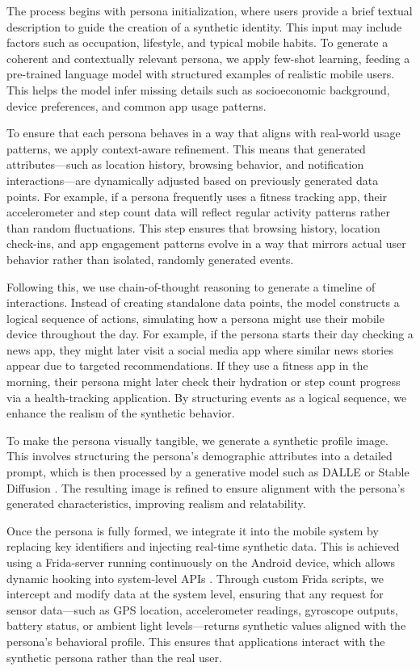 \documentclass[acmlarge, nonacm]{acmart}
\begin{document}
The process begins with persona initialization, where users provide a brief textual description to guide the creation of a synthetic identity. This input may include factors such as occupation, lifestyle, and typical mobile habits. To generate a coherent and contextually relevant persona, we apply few-shot learning, feeding a pre-trained language model with structured examples of realistic mobile users. This helps the model infer missing details such as socioeconomic background, device preferences, and common app usage patterns.

To ensure that each persona behaves in a way that aligns with real-world usage patterns, we apply context-aware refinement. This means that generated attributes—such as location history, browsing behavior, and notification interactions—are dynamically adjusted based on previously generated data points. For example, if a persona frequently uses a fitness tracking app, their accelerometer and step count data will reflect regular activity patterns rather than random fluctuations. This step ensures that browsing history, location check-ins, and app engagement patterns evolve in a way that mirrors actual user behavior rather than isolated, randomly generated events.

Following this, we use chain-of-thought reasoning to generate a timeline of interactions. Instead of creating standalone data points, the model constructs a logical sequence of actions, simulating how a persona might use their mobile device throughout the day. For example, if the persona starts their day checking a news app, they might later visit a social media app where similar news stories appear due to targeted recommendations. If they use a fitness app in the morning, their persona might later check their hydration or step count progress via a health-tracking application. By structuring events as a logical sequence, we enhance the realism of the synthetic behavior.

To make the persona visually tangible, we generate a synthetic profile image. This involves structuring the persona’s demographic attributes into a detailed prompt, which is then processed by a generative model such as DALLE \cite{dalle} or Stable Diffusion \cite{stablediffusion}. The resulting image is refined to ensure alignment with the persona’s generated characteristics, improving realism and relatability.

Once the persona is fully formed, we integrate it into the mobile system by replacing key identifiers and injecting real-time synthetic data. This is achieved using a Frida-server running continuously on the Android device, which allows dynamic hooking into system-level APIs \cite{frida}. Through custom Frida scripts, we intercept and modify data at the system level, ensuring that any request for sensor data—such as GPS location, accelerometer readings, gyroscope outputs, battery status, or ambient light levels—returns synthetic values aligned with the persona's behavioral profile. This ensures that applications interact with the synthetic persona rather than the real user.
\end{document}

